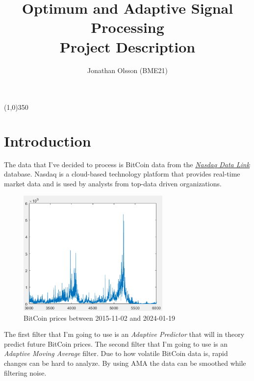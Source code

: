 \documentclass[twoside,twocolumn,9pt,a4paper]{IEEEtran}
\begin{document}
\onecolumn

\title{Optimum and Adaptive Signal Processing \\
\large Project Description}
\author{Jonathan Olsson (BME21)}
\maketitle
\begin{center}
\line(1,0){350}
\end{center}
\IEEEaftertitletext{\vspace{-1\baselineskip}}

\section{Introduction} \label{secIntroduction}
The data that I've decided to process is BitCoin data from the \href{https://www.nasdaq.com/nasdaq-data-link}{\textit{Nasdaq Data Link}} database.
Nasdaq is a cloud-based technology platform that provides real-time market data and is used by analysts from top-data driven organizations.

\begin{figure}[h]
\begin{center}
\includegraphics[width=7.5cm]{Images/bitcoin.png} %
\caption{BitCoin prices between 2015-11-02 and 2024-01-19}
\label{DimensionMicrochip}
\end{center}
\end{figure} %

The first filter that I'm going to use is an \textit{Adaptive Predictor} that will in theory predict future BitCoin prices. The second filter that I'm going to use is an \textit{Adaptive Moving Average} filter. Due to how volatile BitCoin data is, rapid changes can be
hard to analyze. By using AMA the data can be smoothed while filtering noise.
\end{document}
